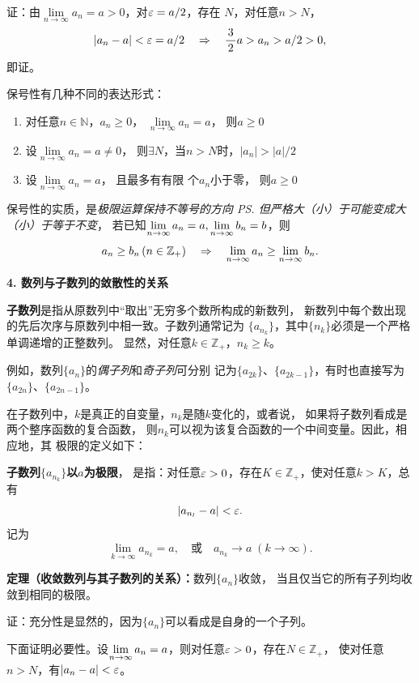 证：由$\lim\limits_{n\to\infty}a_n=a>0$，对$\varepsilon=a/2$，存在
$N$，对任意$n>N$，
$$|a_n-a|<\varepsilon=a/2\quad\Rightarrow\quad \displaystyle\frac{\,{3}\,}{\,{2}\,}a>a_n>a/2>0,$$
即证。\fin
		
保号性有几种不同的表达形式：
\begin{thx}
	\begin{enumerate}[\bf 推论1：]
	  \item 对任意$n\in\mathbb{N}$，$a_n\geq
	  0$， $\lim\limits_{n\to\infty}a_n=a$， 则$a\geq 0$
	  \item 设$\lim\limits_{n\to\infty}a_n=a\ne
	  0$， 则$\exists N$，当$n>N$时，$|a_n|>|a|/2$
	  \item  设$\lim\limits_{n\to\infty}a_n=a$， 且最多有有限
	  个$a_n$小于零， 则$a\geq 0$
	\end{enumerate}	
\end{thx}

保号性的实质，是{\it 极限运算保持不等号的方向
\ps{但严格大（小）于可能变成大（小）于等于}不变}，
若已知$\lim\limits_{n\to\infty} a_n=a,\lim\limits_{n\to\infty} b_n=b$，则
$$a_n\geq b_n\,(n\in\mathbb{Z}_+)\quad\Rightarrow
\quad\lim\limits_{n\to\infty} a_n\geq\lim\limits_{n\to\infty} b_n.$$

\bs
{\bf 4. 数列与子数列的敛散性的关系}

{\bf 子数列}是指从原数列中“取出”无穷多个数所构成的新数列，
新数列中每个数出现的先后次序与原数列中相一致。子数列通常记为
$\{a_{n_k}\}$，其中$\{n_k\}$必须是一个严格单调递增的正整数列。
显然，对任意$k\in\mathbb{Z}_+$，$n_k\geq k$。

例如，数列$\{a_n\}$的{\it 偶子列}和{\it 奇子列}可分别
记为$\{a_{2k}\}$、$\{a_{2k-1}\}$，有时也直接写为
$\{a_{2n}\}$、$\{a_{2n-1}\}$。

在子数列中，$k$是真正的自变量，$n_k$是随$k$变化的，或者说，
如果将子数列看成是两个整序函数的复合函数，
则$n_k$可以视为该复合函数的一个中间变量。因此，相应地，其
极限的定义如下：

{\bf 子数列$\{a_{n_k}\}$以$a$为极限}，
是指：对任意$\varepsilon>0$，存在$K\in\mathbb{Z}_+$，使对任意$k>K$，总有
$$|a_{n_l}-a|<\varepsilon.$$
记为
$$\lim\limits_{k\to\infty}a_{n_k}=a,\quad 
\mbox{或}\quad a_{n_k}\to a\;{(k\to\infty)}.$$

\begin{thx}
	{\bf 定理（收敛数列与其子数列的关系）：}数列$\{a_n\}$收敛，
	当且仅当它的所有子列均收敛到相同的极限。
\end{thx}

证：充分性是显然的，因为$\{a_n\}$可以看成是自身的一个子列。

下面证明必要性。设$\lim\limits_{n\to\infty} a_n=a$，则对任意$\varepsilon>0$，存在$N\in\mathbb{Z}_+$，
使对任意$n>N$，有$|a_n-a|<\varepsilon$。

